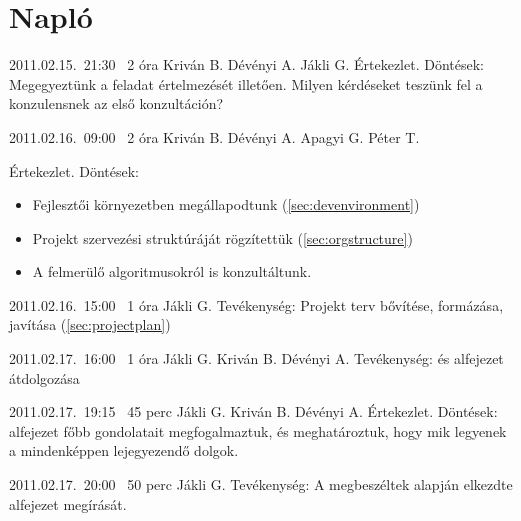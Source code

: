 %
\section{Napló}

\begin{naplo}

\bejegyzes
{2011.02.15.~21:30~}
{2 óra}
{Kriván B.\newline
Dévényi A.\newline
Jákli G.}
{Értekezlet.\newline
Döntések: Megegyeztünk a feladat értelme\-zését illetően.
Milyen kérdéseket teszünk fel a konzulensnek az első konzultáción?}

\bejegyzes
{2011.02.16.~09:00~}
{2 óra}
{Kriván B.\newline
Dévényi A.\newline
Apagyi G.\newline
Péter T.}
{Értekezlet.\newline
Döntések:
\begin{itemize}
\setlength{\itemsep}{0cm}%
\setlength{\parskip}{0cm}%
\item Fejlesztői környezetben megállapodtunk (\ref{sec:devenvironment})
\item Projekt szervezési struktúráját rögzítettük (\ref{sec:orgstructure})
\item A felmerülő algoritmusokról is konzultáltunk.
\end{itemize}
}

\bejegyzes
{2011.02.16.~15:00~}
{1 óra}
{Jákli G.}
{Tevékenység: Projekt terv bővítése, formázá\-sa, javítása (\ref{sec:projectplan})}

\bejegyzes
{2011.02.17.~16:00~}
{1 óra}
{Jákli G.\newline
Kriván B.\newline
Dévényi A.}
{Tevékenység:  és  alfejezet átdolgozása}

\bejegyzes
{2011.02.17.~19:15~}
{45 perc}
{Jákli G.\newline
Kriván B.\newline
Dévényi A.}
{Értekezlet.\newline
Döntések:  alfejezet főbb gondolatait megfogalmaztuk, és meghatároztuk, hogy mik legyenek a mindenképpen lejegyezendő dolgok.}

\bejegyzes
{2011.02.17.~20:00~}
{50 perc}
{Jákli G.}
{Tevékenység: A megbeszéltek alapján el\-kezdte  alfejezet megírását.}


\end{naplo}

